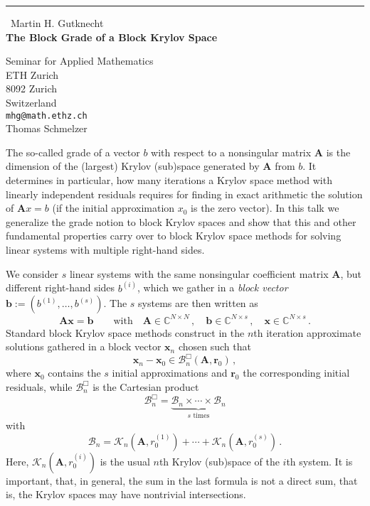 \documentclass{report}
\begin{document}
\begin{center}
\rule{6in}{1pt} \
{\large Martin H. Gutknecht \\
{\bf The Block Grade of a Block Krylov Space}}

Seminar for Applied Mathematics \\ ETH Zurich \\ 8092 Zurich \\ Switzerland
\\
{\tt mhg@math.ethz.ch}\\
Thomas Schmelzer\end{center}

\newtheorem{Thm}{\sc Theorem}
\newtheorem{Cor}[Thm]{\sc Corollary}
\newtheorem{Lem}[Thm]{\sc Lemma}

\newcommand{\CC}{{\mathbb C}}
\newcommand{\RR}{{\mathbb R}}

\newcommand{\q}{\quad}
\newcommand{\qq}{\quad\quad}

\newcommand{\Dim}{\mathop{\mathrm{dim\ }}}
\newcommand{\Span}{\mathsf{span}\,}

\newcommand{\calB}{{\mathcal B}}
\newcommand{\calBB}{{\mathcal B}^{\Box}}
\newcommand{\calK}{\mathcal{K}}

\newcommand{\bfA}{{\mathbf A}}
\newcommand{\bfb}{{\mathbf b}}
\newcommand{\bfr}{{\mathbf r}}
\newcommand{\bfx}{{\mathbf x}}
\newcommand{\bfxex}{{\mathbf x}_{\mbox{\scriptsize $\star$}}}

The so-called grade of a vector $b$ with respect to a nonsingular
matrix $\bfA$ is the dimension of the (largest) Krylov (sub)space generated
by $\bfA$ from $b$. It determines in particular, how many iterations a
Krylov space method with linearly independent residuals requires
for finding in exact arithmetic the solution of $\bfA x=b$ (if the
initial approximation $x_0$ is the zero vector).
In this talk we generalize the grade notion to block Krylov spaces and
show that this and other fundamental properties carry over to block
Krylov space methods for solving linear systems with multiple right-hand
sides.

We consider $s$ linear systems with the same nonsingular coefficient
matrix $\bfA$, but different right-hand sides $b^{(i)}$, which we
gather in a \textit{block vector} $\bfb := (b^{(1)},\dots,b^{(s)})$.
The $s$ systems are then written as
\[
\bfA \bfx = \bfb
\qq \text{with} \q
\bfA \in \CC^{N\times N}\,,\q
\bfb \in \CC^{N\times s}\,,\q
\bfx \in \CC^{N\times s}\,.
\]
Standard block Krylov space methods construct in the $n$th iteration
approximate solutions gathered in a block vector $\bfx_n$ chosen
such that
\[
\bfx_n - \bfx_0 \in \calBB_n (\bfA, \bfr_0) \,,
\]
where $\bfx_0$ contains the $s$ initial approximations and
$\bfr_0$ the corresponding initial residuals, while $\calBB_n$
is the Cartesian product
\[
\calBB_n = \underbrace{\calB_n \times \cdots \times \calB_n}%
_{s\text{ times}}
\]
with
\[
\calB_n =
\calK_n (\bfA, r_0^{(1)}) + \cdots + \calK_n (\bfA, r_0^{(s)}) \,.
\]
Here, $\calK_n (\bfA, r_0^{(i)})$ is the usual $n$th Krylov (sub)space
of the $i$th system. It is important, that, in general, the sum in
the last formula is not a direct sum, that is, the Krylov spaces
may have nontrivial intersections.
\end{document}
